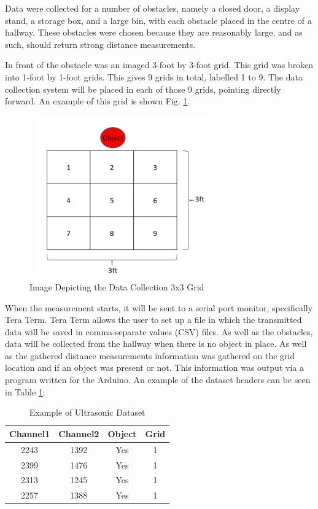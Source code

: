 \documentclass[conference]{IEEEtran}
\begin{document}
Data were collected for a number of obstacles, namely a closed door, a display stand, a storage box, and a large bin, with each obstacle placed in the centre of a hallway. These obstacles were chosen because they are reasonably large, and as such, should return strong distance measurements. 

In front of the obstacle was an imaged 3-foot by 3-foot grid. This grid was broken into 1-foot by 1-foot grids. This gives 9 grids in total, labelled 1 to 9. The data collection system will be placed in each of those 9 grids, pointing directly forward. An example of this grid is shown Fig. \ref{fig:grid1}.

\begin{figure}[ht]
\includegraphics[width=8cm, height=7cm]{images/grid.png}
\centering
\caption{Image Depicting the Data Collection 3x3 Grid}
\label{fig:grid1}
\end{figure}




When the measurement starts, it will be sent to a serial port monitor, specifically Tera Term. Tera Term allows the user to set up a file in which the transmitted data will be saved in comma-separate values (CSV) files. As well as the obstacles, data will be collected from the hallway when there is no object in place. As well as the gathered distance measurements information was gathered on the grid location and if an object was present or not. This information was output via a program written for the Arduino. An example of the dataset headers can be seen in Table \ref{table:1}:

\begin{table}[ht]
\centering
\begin{tabular}{||c c c c||} 
 \hline
 Channel1 & Channel2 & Object & Grid \\ [0.5ex] 
 \hline\hline
 2243 & 1392 & Yes & 1 \\ 
 \hline
 2399 & 1476 & Yes & 1 \\
 \hline
 2313 & 1245 & Yes & 1 \\
 \hline
 2257 & 1388 & Yes & 1 \\ [1ex] 
 \hline
\end{tabular}
\caption{Example of Ultrasonic Dataset}
\label{table:1}
\end{table}
\end{document}
